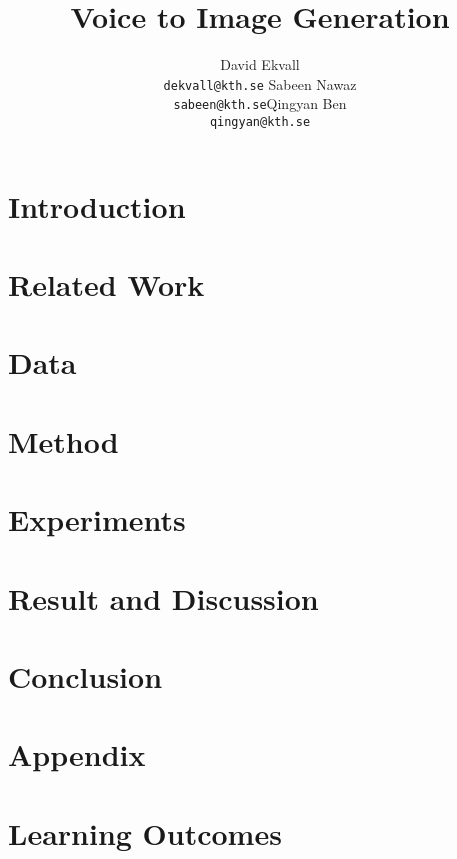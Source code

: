 \documentclass{article}
\title{Voice to Image Generation}
\author{%
   David Ekvall \\ \texttt{dekvall@kth.se} \And Sabeen Nawaz\\\texttt{sabeen@kth.se}\And Qingyan Ben  \\ \texttt{qingyan@kth.se}
}
\begin{document}
\graphicspath{{img/}}
\maketitle
\begin{abstract}

\end{abstract}

\section{Introduction}


\section{Related Work}


\section{Data}


\section{Method}


\section{Experiments}


\section{Result and Discussion}


\section{Conclusion}

\printbibliography

\newpage
\section{Appendix}
\section{Learning Outcomes}

\end{document}
